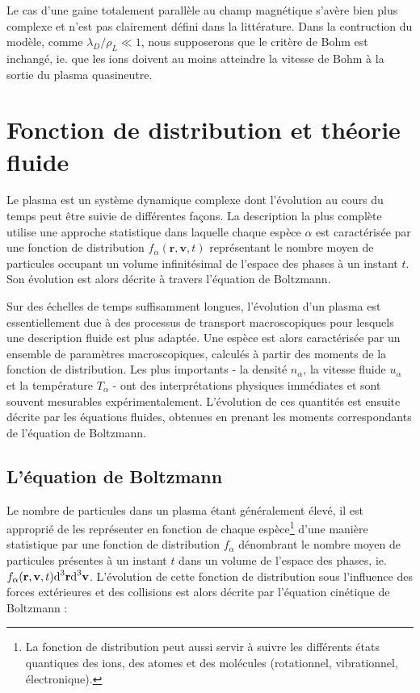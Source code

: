 \begin{refsection}
 Le cas d'une gaine totalement parallèle au champ magnétique s'avère bien plus
 complexe et n'est pas clairement défini dans la littérature. Dans la
 contruction du modèle, comme $\lambda_D/\rho_L\ll 1$, nous supposerons que le
 critère de Bohm est inchangé, ie. que les ions doivent au moins atteindre la
 vitesse de Bohm à la sortie du plasma quasineutre.

\section{Fonction de distribution et théorie fluide}
\label{Maxwell-Boltzmann}

Le plasma est un système dynamique complexe dont l'évolution au cours du temps
peut être suivie de différentes façons. La description la plus complète utilise
une approche statistique dans laquelle chaque espèce $\alpha$ est caractérisée
par une fonction de distribution $f_\alpha(\mathbf{r},\mathbf{v},t)$
représentant le nombre moyen de particules occupant un volume infinitésimal
de l'espace des phases à un instant $t$. Son évolution est alors décrite à
travers l'équation de Boltzmann.

Sur des échelles de temps suffisamment longues, l'évolution d'un plasma est 
essentiellement due à des processus de transport macroscopiques pour lesquels
une description fluide est plus adaptée. Une espèce est alors
caractérisée par un ensemble de paramètres macroscopiques, calculés à
partir des moments de la fonction de distribution. Les plus importants -
la densité $n_\alpha$, la vitesse fluide $u_\alpha$ et la température $T_\alpha$
- ont des interprétations physiques immédiates et sont souvent mesurables
expérimentalement. L'évolution de ces quantités est ensuite décrite par les
équations fluides, obtenues en prenant les moments correspondants de l'équation de Boltzmann.

\subsection{L'équation de Boltzmann}
Le nombre de particules dans un plasma étant généralement élevé, il est
approprié de les représenter en fonction de chaque
espèce\footnote{La fonction de
distribution peut aussi servir à suivre les différents états quantiques des
ions, des atomes et des molécules (rotationnel, vibrationnel, électronique).}
d'une manière statistique par une fonction de
distribution $f_\alpha$ dénombrant le nombre moyen de particules présentes à un
instant $t$ dans un volume de l'espace des phases, ie. $f_\alpha(\mathbf
r,\mathbf v,t)\text{d}^{{3}}\mathbf r\text{d}^{{3}}\mathbf v$.
L'évolution de cette fonction de distribution sous l'influence des forces
extérieures et des collisions est alors décrite par l'équation cinétique de
Boltzmann :


\end{refsection}
